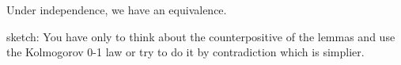 \documentclass[12pt]{article}
\begin{document}
Under independence, we have an equivalence. 

sketch: You have only to think about the counterpositive of the lemmas and use the Kolmogorov 0-1 law or try to do it by contradiction which is simplier.
\end{document}
